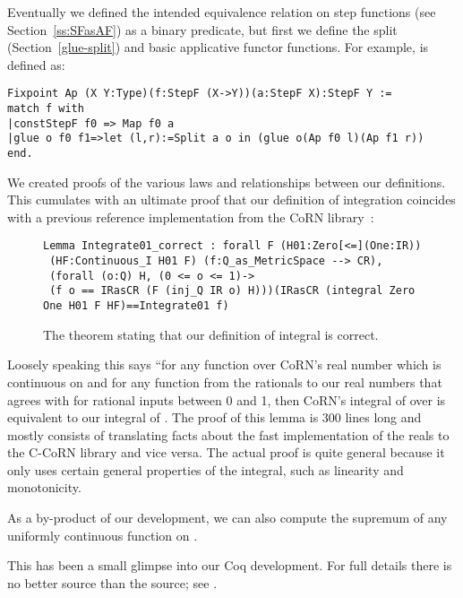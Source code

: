 \documentclass{elsarticle}
\newcommand{\tmtexttt}[1]{{\ttfamily{#1}}}
\begin{document}
Eventually we defined the intended equivalence relation on step functions (see
Section~\ref{ss:SFasAF}) as a binary predicate, but first we define the split
(Section~\ref{glue-split}) and basic applicative functor functions. For
example, \tmtexttt{Ap} is defined as:
\begin{verbatim}
Fixpoint Ap (X Y:Type)(f:StepF (X->Y))(a:StepF X):StepF Y :=
match f with
|constStepF f0 => Map f0 a
|glue o f0 f1=>let (l,r):=Split a o in (glue o(Ap f0 l)(Ap f1 r))
end.
\end{verbatim}

We created proofs of the various laws and relationships between our
definitions. This cumulates with an ultimate proof that our definition of
integration coincides with a previous reference implementation from the CoRN
library~{\cite{lcf:03}}:
\begin{figure}
\begin{verbatim}
Lemma Integrate01_correct : forall F (H01:Zero[<=](One:IR))
 (HF:Continuous_I H01 F) (f:Q_as_MetricSpace --> CR),
 (forall (o:Q) H, (0 <= o <= 1)->
 (f o == IRasCR (F (inj_Q IR o) H)))(IRasCR (integral Zero One H01 F HF)==Integrate01 f)\end{verbatim}\caption{The theorem stating that our definition of integral is correct.}
\end{figure}

Loosely speaking this says ``for any function \tmtexttt{F} over CoRN's real
number which is continuous on  and for any function \tmtexttt{f} from
the rationals to our real numbers that agrees with \tmtexttt{F} for rational
inputs between 0 and 1, then CoRN's integral of \tmtexttt{F} over  is
equivalent to our integral of \tmtexttt{f}. The proof of this lemma is 300
lines long and mostly consists of translating facts about the fast
implementation of the reals to the C-CoRN library and vice versa. The actual
proof is quite general because it only uses certain general properties of the
integral, such as linearity and monotonicity.

As a by-product of our development, we can also compute the supremum of any
uniformly continuous function on .

This has been a small glimpse into our Coq development. For full details
there is no better source than the source; see \tmtexttt{http://c-corn.cs.ru.nl}.
\end{document}
